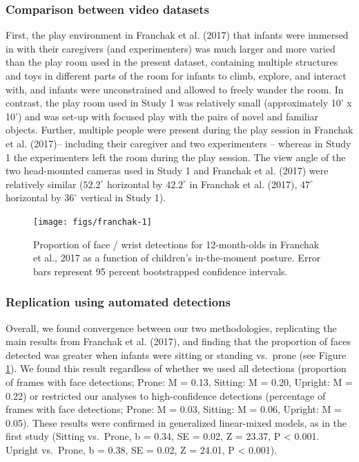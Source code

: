 \documentclass[english,man]{apa6}
\begin{document}
\subsubsection{Comparison between video
datasets}\label{comparison-between-video-datasets}

First, the play environment in Franchak et al. (2017) that infants were
immersed in with their caregivers (and experimenters) was much larger
and more varied than the play room used in the present dataset,
containing multiple structures and toys in different parts of the room
for infants to climb, explore, and interact with, and infants were
unconstrained and allowed to freely wander the room. In contrast, the
play room used in Study 1 was relatively small (approximately 10' x 10')
and was set-up with focused play with the pairs of novel and familiar
objects. Further, multiple people were present during the play session
in Franchak et al. (2017)-- including their caregiver and two
experimenters -- whereas in Study 1 the experimenters left the room
during the play session. The view angle of the two head-mounted cameras
used in Study 1 and Franchak et al. (2017) were relatively similar
(\(52.2^{\circ}\) horizontal by \(42.2^{\circ}\) in Franchak et al.
(2017), \(47^{\circ}\) horizontal by \(36^{\circ}\) vertical in Study
1).

\begin{figure}[H]

{\centering \texttt{[image: figs/franchak-1]} 

}

\caption{Proportion of face / wrist detections for 12-month-olds in Franchak et al., 2017 as a function of children's in-the-moment posture. Error bars represent 95 percent bootstrapped confidence intervals.}\label{fig:franchak}
\end{figure}

\subsubsection{Replication using automated
detections}\label{replication-using-automated-detections}

Overall, we found convergence between our two methodologies, replicating
the main results from Franchak et al. (2017), and finding that the
proportion of faces detected was greater when infants were sitting or
standing vs.~prone (see Figure \ref{fig:franchak}). We found this result
regardless of whether we used all detections (proportion of frames with
face detections; Prone: M = 0.13, Sitting: M = 0.20, Upright: M = 0.22)
or restricted our analyses to high-confidence detections (percentage of
frames with face detections; Prone: M = 0.03, Sitting: M = 0.06,
Upright: M = 0.05). These results were confirmed in generalized
linear-mixed models, as in the first study (Sitting vs.~Prone, b = 0.34,
SE = 0.02, Z = 23.37, P \textless{} 0.001. Upright vs.~Prone, b = 0.38,
SE = 0.02, Z = 24.01, P \textless{} 0.001).
\end{document}
